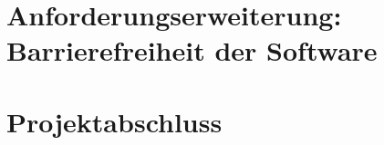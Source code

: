 \documentclass[12pt,oneside]{article}
\begin{document}
\section{Anforderungserweiterung: Barrierefreiheit der Software}


\section{Projektabschluss}




\clearpage



\appendix
\end{document}

